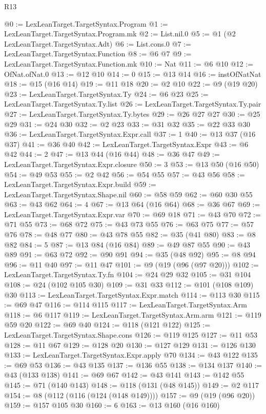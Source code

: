 \begin{lexlean}{R13}
\begin{coremodule}
@0 := LexLeanTarget.TargetSyntax.Program
@1 := LexLeanTarget.TargetSyntax.Program.mk
@2 := List.nil.{0}
@5 := @1 (@2 LexLeanTarget.TargetSyntax.Adt)
@6 := List.cons.{0}
@7 := LexLeanTarget.TargetSyntax.Function
@8 := @6 @7
@9 := LexLeanTarget.TargetSyntax.Function.mk
@10 := Nat
@11 := @6 @10
@12 := OfNat.ofNat.{0}
@13 := @12 @10
@14 := 0
@15 := @13 @14
@16 := instOfNatNat
@18 := @15 (@16 @14)
@19 := @11 @18
@20 := @2 @10
@22 := @9 (@19 @20)
@23 := LexLeanTarget.TargetSyntax.Ty
@24 := @6 @23
@25 := LexLeanTarget.TargetSyntax.Ty.list
@26 := LexLeanTarget.TargetSyntax.Ty.pair
@27 := LexLeanTarget.TargetSyntax.Ty.bytes
@29 := @26 @27 @27
@30 := @25 @29
@31 := @24 @30
@32 := @2 @23
@33 := @31 @32
@35 := @22 @33 @30
@36 := LexLeanTarget.TargetSyntax.Expr.call
@37 := 1
@40 := @13 @37 (@16 @37)
@41 := @36 @40
@42 := LexLeanTarget.TargetSyntax.Expr
@43 := @6 @42
@44 := 2
@47 := @13 @44 (@16 @44)
@48 := @36 @47
@49 := LexLeanTarget.TargetSyntax.Expr.closure
@50 := 3
@53 := @13 @50 (@16 @50)
@54 := @49 @53
@55 := @2 @42
@56 := @54 @55
@57 := @43 @56
@58 := LexLeanTarget.TargetSyntax.Expr.build
@59 := LexLeanTarget.TargetSyntax.Shape.nil
@60 := @58 @59
@62 := @60 @30 @55
@63 := @43 @62
@64 := 4
@67 := @13 @64 (@16 @64)
@68 := @36 @67
@69 := LexLeanTarget.TargetSyntax.Expr.var
@70 := @69 @18
@71 := @43 @70
@72 := @71 @55
@73 := @68 @72
@75 := @43 @73 @55
@76 := @63 @75
@77 := @57 @76
@78 := @48 @77
@80 := @43 @78 @55
@82 := @35 (@41 @80)
@83 := @8 @82
@84 := 5
@87 := @13 @84 (@16 @84)
@89 := @49 @87 @55
@90 := @43 @89
@91 := @63 @72
@92 := @90 @91
@94 := @35 (@48 @92)
@95 := @8 @94
@96 := @11 @40
@97 := @11 @47
@101 := @9 (@19 (@96 (@97 @20)))
@102 := LexLeanTarget.TargetSyntax.Ty.fn
@104 := @24 @29 @32
@105 := @31 @104
@108 := @24 (@102 @105 @30)
@109 := @31 @33
@112 := @101 (@108 @109) @30
@113 := LexLeanTarget.TargetSyntax.Expr.match
@114 := @113 @30
@115 := @69 @47
@116 := @114 @115
@117 := LexLeanTarget.TargetSyntax.Arm
@118 := @6 @117
@119 := LexLeanTarget.TargetSyntax.Arm.arm
@121 := @119 @59 @20
@122 := @69 @40
@124 := @118 (@121 @122)
@125 := LexLeanTarget.TargetSyntax.Shape.cons
@126 := @119 @125
@127 := @11 @53
@128 := @11 @67
@129 := @128 @20
@130 := @127 @129
@131 := @126 @130
@133 := LexLeanTarget.TargetSyntax.Expr.apply @70
@134 := @43 @122
@135 := @69 @53
@136 := @43 @135
@137 := @136 @55
@138 := @134 @137
@140 := @43 (@133 @138)
@141 := @69 @67
@142 := @43 @141
@143 := @142 @55
@145 := @71 (@140 @143)
@148 := @118 (@131 (@48 @145))
@149 := @2 @117
@154 := @8 (@112 (@116 (@124 (@148 @149))))
@157 := @9 (@19 (@96 @20))
@159 := @157 @105 @30
@160 := 6
@163 := @13 @160 (@16 @160)

\end{coremodule}
\end{lexlean}
